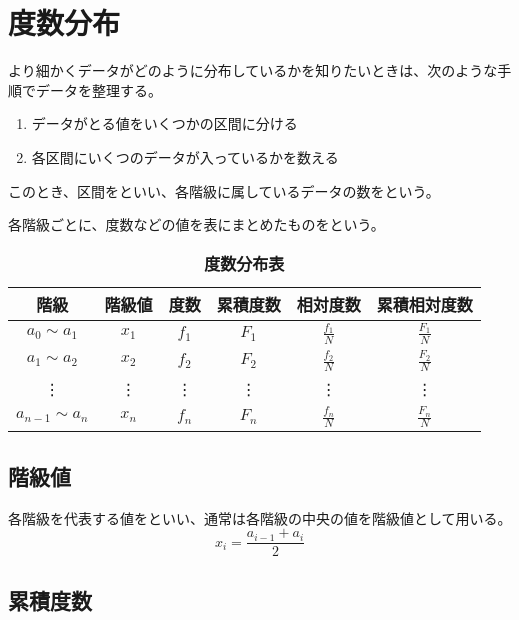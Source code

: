 \documentclass[../../../topic_statistics]{subfiles}
\begin{document}
\sectionline
\section{度数分布}

より細かくデータがどのように分布しているかを知りたいときは、次のような手順でデータを整理する。
\begin{enumerate}
  \item データがとる値をいくつかの区間に分ける
  \item 各区間にいくつのデータが入っているかを数える
\end{enumerate}

このとき、区間をといい、各階級に属しているデータの数をという。

\br

各階級ごとに、度数などの値を表にまとめたものをという。

\begin{table}[htbp]
  \centering
  \caption*{\bfseries 度数分布表}
  \begin{tabular}{|c|c|c|c|c|c|}
    \hline
    階級 & 階級値 & 度数 & 累積度数 & 相対度数 & 累積相対度数 \\
    \hline
    $a_0 \sim a_1$ & $x_1$ & $f_1$ & $F_1$ & $\frac{f_1}{N}$ & $\frac{F_1}{N}$ \\
    $a_1 \sim a_2$ & $x_2$ & $f_2$ & $F_2$ & $\frac{f_2}{N}$ & $\frac{F_2}{N}$ \\
    \vdots & \vdots & \vdots & \vdots & \vdots & \vdots \\
    $a_{n-1} \sim a_n$ & $x_n$ & $f_n$ & $F_n$ & $\frac{f_n}{N}$ & $\frac{F_n}{N}$ \\
    \hline
  \end{tabular}
\end{table}

\subsection{階級値}

各階級を代表する値をといい、通常は各階級の中央の値を階級値として用いる。
\begin{equation*}
  x_i = \frac{a_{i-1} + a_i}{2}
\end{equation*}

\subsection{累積度数}
\end{document}
